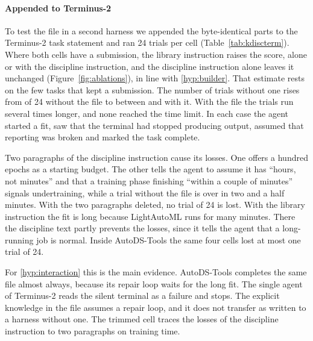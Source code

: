 \paragraph{Appended to Terminus-2}
\label{sec:abl-terminus}
To test the file in a second harness we appended the byte-identical parts to
the Terminus-2 task statement and ran 24 trials per cell
(Table~\ref{tab:kdiscterm}). Where both cells have a submission, the
library instruction raises the score, alone or with the discipline
instruction, and the discipline instruction alone leaves it unchanged
(Figure~\ref{fig:ablations}), in line with \ref{hyp:builder}. That estimate
rests on the few tasks that kept a submission. The number of trials without
one rises from \ktNeitherLost{} of 24 without the file to between
\ktBothLost{} and \ktToolLost{} with it. With the file the trials run several
times longer, and none reached the time limit. In each case the
agent started a fit, saw that the terminal had stopped producing output,
assumed that reporting was broken and marked the task complete.


Two paragraphs of the discipline instruction cause its losses. One offers a
hundred epochs as a starting budget. The other tells the agent to assume it
has ``hours, not minutes'' and that a training phase finishing ``within a
couple of minutes'' signals undertraining, while a trial without the file is
over in two and a half minutes. With the two paragraphs deleted, no trial of
24 is lost. With the library instruction the fit is long because LightAutoML
runs for many minutes. There the discipline text partly prevents the losses,
since it tells the agent that a long-running job is normal. Inside
AutoDS-Tools the same four cells lost at most one trial of 24.

For \ref{hyp:interaction} this is the main evidence. AutoDS-Tools completes
the same file almost always, because its repair loop waits for the long fit.
The single agent of Terminus-2 reads the silent terminal as a failure and
stops. The explicit knowledge in the file assumes a repair loop, and it
does not transfer as written to a harness without one. The trimmed cell traces the losses of the discipline instruction to
two paragraphs on training time.

